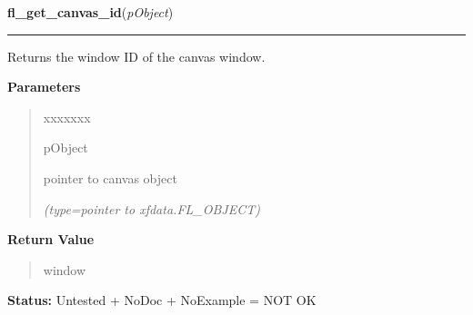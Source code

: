     \vspace{0.5ex}

\hspace{.8\funcindent}\begin{boxedminipage}{\funcwidth}

    \raggedright \textbf{fl\_get\_canvas\_id}(\textit{pObject})

    \vspace{-1.5ex}

    \rule{\textwidth}{0.5\fboxrule}
\setlength{\parskip}{2ex}
    Returns the window ID of the canvas window.

\setlength{\parskip}{1ex}
      \textbf{Parameters}
      \vspace{-1ex}

      \begin{quote}
        \begin{Ventry}{xxxxxxx}

          \item[pObject]

          pointer to canvas object

            {\it (type=pointer to xfdata.FL\_OBJECT)}

        \end{Ventry}

      \end{quote}

      \textbf{Return Value}
    \vspace{-1ex}

      \begin{quote}
      window

      \end{quote}

\textbf{Status:} Untested + NoDoc + NoExample = NOT OK



    \end{boxedminipage}

    \label{xformslib:library:fl_get_canvas_colormap}

    \vspace{0.5ex}

